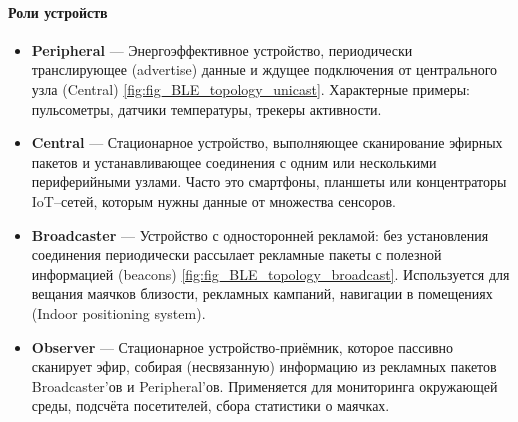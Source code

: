 \documentclass[a4paper,12pt]{article}
\begin{document}
\paragraph{Роли устройств}
\begin{itemize}
  \item \textbf{Peripheral} — Энергоэффективное устройство, периодически транслирующее (advertise) данные и ждущее подключения от центрального узла (Central) \ref{fig:fig_BLE_topology_unicast}. Характерные примеры: пульсометры, датчики температуры, трекеры активности.
  \item \textbf{Central} — Стационарное устройство, выполняющее сканирование эфирных пакетов и устанавливающее соединения с одним или несколькими периферийными узлами. Часто это смартфоны, планшеты или концентраторы IoT--сетей, которым нужны данные от множества сенсоров.
  \item \textbf{Broadcaster} — Устройство с односторонней рекламой: без установления соединения периодически рассылает рекламные пакеты с полезной информацией (beacons) \ref{fig:fig_BLE_topology_broadcast}. Используется для вещания маячков близости, рекламных кампаний, навигации в помещениях (Indoor positioning system).
  \item \textbf{Observer} — Стационарное устройство‑приёмник, которое пассивно сканирует эфир, собирая (несвязанную) информацию из рекламных пакетов Broadcaster’ов и Peripheral’ов. Применяется для мониторинга окружающей среды, подсчёта посетителей, сбора статистики о маячках.
\end{itemize}
\end{document}
